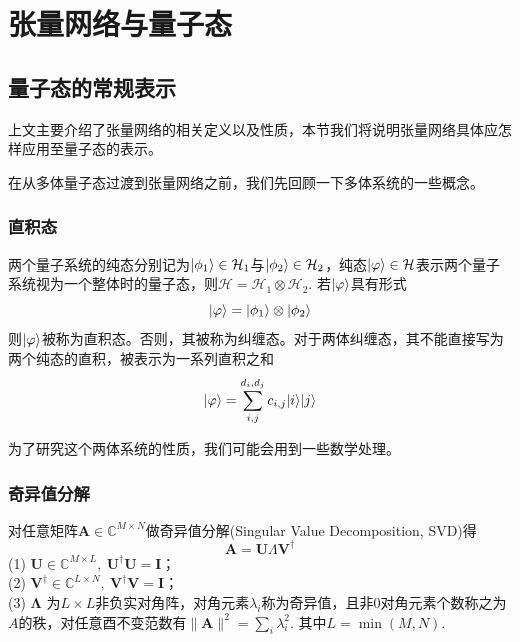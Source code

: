 \section{张量网络与量子态}

\subsection{量子态的常规表示}

上文主要介绍了张量网络的相关定义以及性质，本节我们将说明张量网络具体应怎样应用至量子态的表示。

在从多体量子态过渡到张量网络之前，我们先回顾一下多体系统的一些概念。

\subsubsection{直积态}

两个量子系统的纯态分别记为$\lvert\phi_1\rangle\in\mathcal{H}_1$与$\lvert\phi_2\rangle\in\mathcal{H}_2$，纯态$\lvert\varphi\rangle\in\mathcal{H}$表示两个量子系统视为一个整体时的量子态，则$\mathcal{H} = \mathcal{H}_1\otimes\mathcal{H}_2$. 若$\lvert\varphi\rangle$具有形式
\begin{equation}\label{eq-product-state}
\lvert\varphi\rangle=\lvert\phi_1\rangle\otimes\lvert\phi_2\rangle
\end{equation}
则$\lvert\varphi\rangle$被称为直积态。否则，其被称为纠缠态。对于两体纠缠态，其不能直接写为两个纯态的直积，被表示为一系列直积之和
\begin{equation}\label{eq-product-state-sum}
\lvert\varphi\rangle = \sum_{i,j}^{d_i,d_j} c_{i,j}\lvert i\rangle\lvert j\rangle
\end{equation}

为了研究这个两体系统的性质，我们可能会用到一些数学处理。

\subsubsection{奇异值分解}

对任意矩阵$\symbf{A}\in\mathbb{C}^{M\times N}$做奇异值分解\cite{stewartEarlyHistorySingular1993}(Singular Value Decomposition, SVD)得
\begin{equation}\label{eq-SVD}
\symbf{A} = \symbf{U} \Lambda \symbf{V}^\dagger
\end{equation}
(1) $\symbf{U}\in\mathbb{C}^{M\times L},\: \symbf{U}^\dagger \symbf{U}=\symbf{I}$；\\(2) $\symbf{V}^\dagger\in\mathbb{C}^{L\times N},\: \symbf{V}^\dagger \symbf{V}=\symbf{I}$；\\(3) $\symbf{\Lambda}$ 为$L\times L$非负实对角阵，对角元素$\lambda_i$称为奇异值，且非$0$对角元素个数称之为$A$的秩，对任意酉不变范数有$\lVert \symbf{A} \rVert^2=\sum_i \lambda_i^2$. 其中$L=\min(M,N)$.

